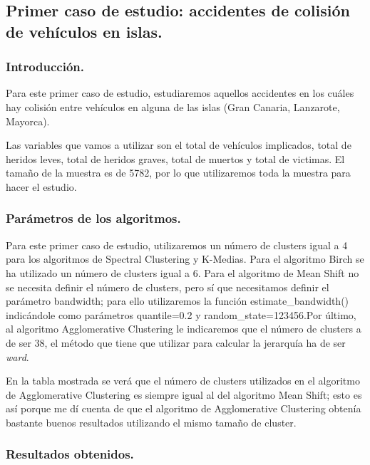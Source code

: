 	
	\subsection[Caso de estudio 1]{Primer caso de estudio: accidentes de colisión de vehículos en islas.}
	\subsubsection{Introducción.}
	Para este primer caso de estudio, estudiaremos aquellos accidentes en los cuáles hay colisión entre vehículos en alguna de las islas (Gran Canaria, Lanzarote, Mayorca).
	
	\vspace{0.06in}
	Las variables que vamos a utilizar son el total de vehículos implicados, total de heridos leves, total de heridos graves, total de muertos y total de victimas. El tamaño de la muestra es de 5782, por lo que utilizaremos toda la muestra para hacer el estudio. 
	
	\vspace{0.06in}
	
	\subsubsection{Parámetros de los algoritmos.}
	Para este primer caso de estudio, utilizaremos un número de clusters igual a 4 para los algoritmos de Spectral Clustering y K-Medias. Para el algoritmo Birch se ha utilizado un número de clusters igual a 6. Para el algoritmo de Mean Shift no se necesita definir el número de clusters, pero sí que necesitamos definir el parámetro bandwidth; para ello utilizaremos la función estimate\_bandwidth() indicándole como parámetros quantile=0.2 y random\_state=123456.Por último, al algoritmo Agglomerative Clustering le indicaremos que el número de clusters a de ser 38, el método que tiene que utilizar para calcular la jerarquía ha de ser \textit{ward}.
	
	\vspace{0.06in}
	
	En la tabla mostrada se verá que el número de clusters utilizados en el algoritmo de Agglomerative Clustering es siempre igual al del algoritmo Mean Shift; esto es así porque me dí cuenta de que el algoritmo de Agglomerative Clustering obtenía bastante buenos resultados utilizando el mismo tamaño de cluster.
	
	\subsubsection{Resultados obtenidos.} 
	
